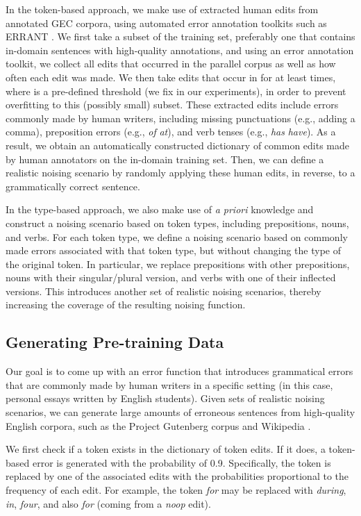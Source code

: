 \documentclass[11pt,a4paper]{article}
\begin{document}
In the token-based approach, we make use of extracted human edits from annotated GEC corpora, using automated error annotation toolkits such as ERRANT \cite{bryant2017automatic}.
We first take a subset of the training set, preferably one that contains in-domain sentences with high-quality annotations, and using an error annotation toolkit, we collect all edits that occurred in the parallel corpus as well as how often each edit was made. 
We then take edits that occur in for at least  times, where  is a pre-defined threshold (we fix  in our experiments), in order to prevent overfitting to this (possibly small) subset.
These extracted edits include errors commonly made by human writers, including missing punctuations (e.g., adding a comma), preposition errors (e.g., \textit{of}  \textit{at}), and verb tenses (e.g., \textit{has}  \textit{have}). 
As a result, we obtain an automatically constructed dictionary of common edits made by human annotators on the in-domain training set.
Then, we can define a realistic noising scenario by randomly applying these human edits, in reverse, to a grammatically correct sentence.

In the type-based approach, we also make use of \textit{a priori} knowledge and construct a noising scenario based on token types, including prepositions, nouns, and verbs. 
For each token type, we define a noising scenario based on commonly made errors associated with that token type, but without changing the type of the original token.
In particular, we replace prepositions with other prepositions, nouns with their singular/plural version, and verbs with one of their inflected versions.
This introduces another set of realistic noising scenarios, thereby increasing the coverage of the resulting noising function.


\subsection{Generating Pre-training Data}\label{sec:generate_data}


Our goal is to come up with an error function that introduces grammatical errors that are commonly made by human writers in a specific setting (in this case, personal essays written by English students). 
Given sets of realistic noising scenarios, we can generate large amounts of erroneous sentences from high-quality English corpora, such as the Project Gutenberg corpus \cite{lahiri2014complexity} and Wikipedia \cite{merity2016pointer}.

We first check if a token exists in the dictionary of token edits. If it does, a token-based error is generated with the probability of 0.9. Specifically, the token is replaced by one of the associated edits with the probabilities proportional to the frequency of each edit.
For example, the token \textit{for} may be replaced with \textit{during}, \textit{in}, \textit{four}, and also \textit{for} (coming from a \textit{noop} edit). 
\end{document}
